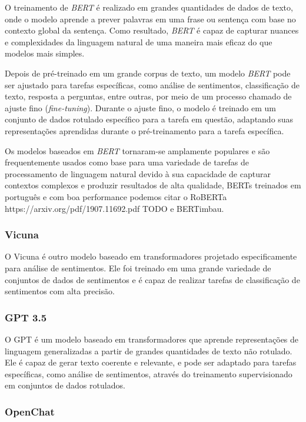 O treinamento de \emph{BERT} é realizado em grandes quantidades de dados de texto, onde o modelo aprende a prever palavras em uma frase ou sentença com base no contexto global da sentença. Como resultado, \emph{BERT} é capaz de capturar nuances e complexidades da linguagem natural de uma maneira mais eficaz do que modelos mais simples.

Depois de pré-treinado em um grande corpus de texto, um modelo \emph{BERT} pode ser ajustado para tarefas específicas, como análise de sentimentos, classificação de texto, resposta a perguntas, entre outras, por meio de um processo chamado de ajuste fino (\textit{fine-tuning}). Durante o ajuste fino, o modelo é treinado em um conjunto de dados rotulado específico para a tarefa em questão, adaptando suas representações aprendidas durante o pré-treinamento para a tarefa específica.

Os modelos baseados em \emph{BERT} tornaram-se amplamente populares e são frequentemente usados como base para uma variedade de tarefas de processamento de linguagem natural devido à sua capacidade de capturar contextos complexos e produzir resultados de alta qualidade, BERTs treinados em português e com boa performance podemos citar o RoBERTa {https://arxiv.org/pdf/1907.11692.pdf} TODO e BERTimbau.

\subsubsection{Vicuna}

O Vicuna \cite{vicuna2023} é outro modelo baseado em transformadores projetado especificamente para análise de sentimentos. Ele foi treinado em uma grande variedade de conjuntos de dados de sentimentos e é capaz de realizar tarefas de classificação de sentimentos com alta precisão.

\subsubsection{GPT 3.5}
O GPT é um modelo baseado em transformadores que aprende representações de linguagem generalizadas a partir de grandes quantidades de texto não rotulado. Ele é capaz de gerar texto coerente e relevante, e pode ser adaptado para tarefas específicas, como análise de sentimentos, através do treinamento supervisionado em conjuntos de dados rotulados.


\subsubsection{OpenChat}


